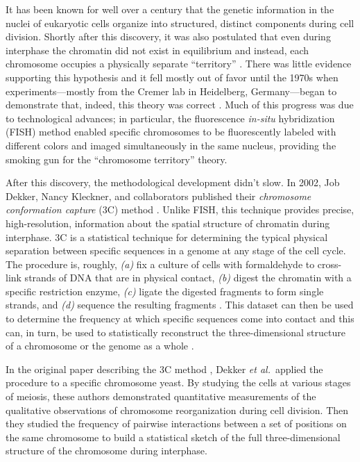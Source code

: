 \documentclass[12pt]{article}
\newcommand{\etal}{\emph{et al.}}
\begin{document}
It has been known for well over a century that the genetic information in the
nuclei of eukaryotic cells organize into structured, distinct components
during cell division.
Shortly after this discovery, it was also postulated that even during
interphase the chromatin did not exist in equilibrium and instead, each
chromosome occupies a physically separate ``territory'' \cite{old}.
There was little evidence supporting this hypothesis and it fell mostly out of
favor until the 1970s when experiments---mostly from the Cremer lab in
Heidelberg, Germany---began to demonstrate that, indeed, this theory was
correct \cite{zorn, hamster, cremer, local}.
Much of this progress was due to technological advances; in particular, the
fluorescence \emph{in-situ} hybridization (FISH) method enabled specific
chromosomes to be fluorescently labeled with different colors and imaged
simultaneously in the same nucleus, providing the smoking gun for the
``chromosome territory'' theory.

After this discovery, the methodological development didn't slow.
In 2002, Job Dekker, Nancy Kleckner, and collaborators published their
\emph{chromosome conformation capture} (3C) method \cite{ccc}.
Unlike FISH, this technique provides precise, high-resolution, information
about the spatial structure of chromatin during interphase.
3C is a statistical technique for determining the typical physical separation
between specific sequences in a genome at any stage of the cell cycle.
The procedure is, roughly, \emph{(a)} fix a culture of cells with formaldehyde
to cross-link strands of DNA that are in physical contact, \emph{(b)} digest
the chromatin with a specific restriction enzyme, \emph{(c)} ligate the
digested fragments to form single strands, and \emph{(d)} sequence the
resulting fragments \cite{3c-review1}.
This dataset can then be used to determine the frequency at which specific
sequences come into contact and this can, in turn, be used to statistically
reconstruct the three-dimensional structure of a chromosome or the genome as a
whole \cite{ccc}.

In the original paper describing the 3C method \cite{ccc}, Dekker \etal\
applied the procedure to a specific chromosome yeast.
By studying the cells at various stages of meiosis, these authors demonstrated
quantitative measurements of the qualitative observations of chromosome
reorganization during cell division.
Then they studied the frequency of pairwise interactions between a set of
positions on the same chromosome to build a statistical sketch of the full
three-dimensional structure of the chromosome during interphase.
\end{document}
